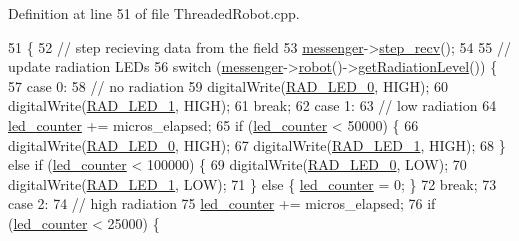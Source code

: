 Definition at line 51 of file Threaded\+Robot.\+cpp.


\begin{DoxyCode}
51                                                               \{
52     \textcolor{comment}{// step recieving data from the field}
53     \hyperlink{class_threaded_robot_a7ff65f6f18c5d3a9d5823e0a00b46c9f}{messenger}->\hyperlink{class_messenger_abdf16b0ba616983f4c4b1895ed937eb2}{step\_recv}();
54 
55     \textcolor{comment}{// update radiation LEDs}
56     \textcolor{keywordflow}{switch} (\hyperlink{class_threaded_robot_a7ff65f6f18c5d3a9d5823e0a00b46c9f}{messenger}->\hyperlink{class_messenger_aa07992df20b2aee6d2c4defd8d6b110c}{robot}()->\hyperlink{class_robot_data_a8bffbd345dfd74acedd44270133e0477}{getRadiationLevel}()) \{
57         \textcolor{keywordflow}{case} 0:
58             \textcolor{comment}{// no radiation}
59             digitalWrite(\hyperlink{config_8h_ae7a4f981c8c2fee871cca8ce6de40436}{RAD\_LED\_0}, HIGH);
60             digitalWrite(\hyperlink{config_8h_a4fdb8eb7f018736d83447712b34a6438}{RAD\_LED\_1}, HIGH);
61         \textcolor{keywordflow}{break};
62         \textcolor{keywordflow}{case} 1:
63             \textcolor{comment}{// low radiation}
64             \hyperlink{class_threaded_robot_a857a1c5a3488176bd5a4bafc1b6d1d89}{led\_counter} += micros\_elapsed;
65             \textcolor{keywordflow}{if} (\hyperlink{class_threaded_robot_a857a1c5a3488176bd5a4bafc1b6d1d89}{led\_counter} < 50000) \{
66                 digitalWrite(\hyperlink{config_8h_ae7a4f981c8c2fee871cca8ce6de40436}{RAD\_LED\_0}, HIGH);
67                 digitalWrite(\hyperlink{config_8h_a4fdb8eb7f018736d83447712b34a6438}{RAD\_LED\_1}, HIGH);
68             \} \textcolor{keywordflow}{else} \textcolor{keywordflow}{if} (\hyperlink{class_threaded_robot_a857a1c5a3488176bd5a4bafc1b6d1d89}{led\_counter} < 100000) \{
69                 digitalWrite(\hyperlink{config_8h_ae7a4f981c8c2fee871cca8ce6de40436}{RAD\_LED\_0}, LOW);
70                 digitalWrite(\hyperlink{config_8h_a4fdb8eb7f018736d83447712b34a6438}{RAD\_LED\_1}, LOW);
71             \} \textcolor{keywordflow}{else} \{ \hyperlink{class_threaded_robot_a857a1c5a3488176bd5a4bafc1b6d1d89}{led\_counter} = 0; \}
72         \textcolor{keywordflow}{break};
73         \textcolor{keywordflow}{case} 2:
74             \textcolor{comment}{// high radiation}
75             \hyperlink{class_threaded_robot_a857a1c5a3488176bd5a4bafc1b6d1d89}{led\_counter} += micros\_elapsed;
76             \textcolor{keywordflow}{if} (\hyperlink{class_threaded_robot_a857a1c5a3488176bd5a4bafc1b6d1d89}{led\_counter} < 25000) \{

\end{DoxyCode}
